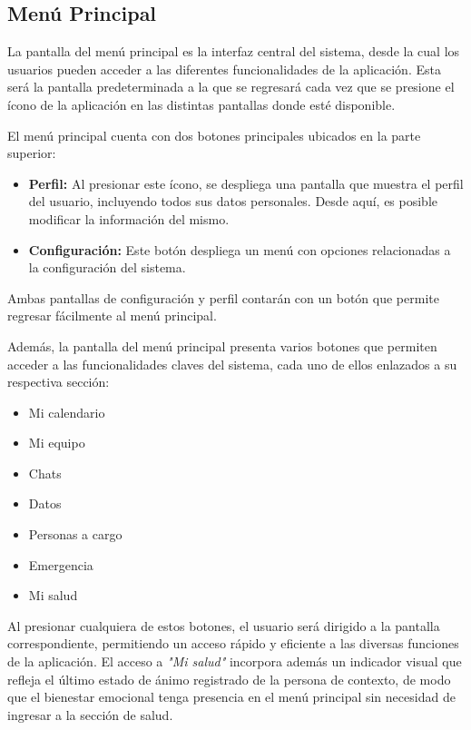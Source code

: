 \documentclass[a4paper,12pt]{article}
\begin{document}
    \subsection{Menú Principal}
    \par La pantalla del menú principal es la interfaz central del sistema, desde la cual los usuarios pueden acceder a las diferentes funcionalidades de la aplicación. Esta será la pantalla predeterminada a la que se regresará cada vez que se presione el ícono de la aplicación en las distintas pantallas donde esté disponible.
    \par El menú principal cuenta con dos botones principales ubicados en la parte superior:
    \begin{itemize}
        \item \textbf{Perfil:} Al presionar este ícono, se despliega una pantalla que muestra el perfil del usuario, incluyendo todos sus datos personales. Desde aquí, es posible modificar la información del mismo.
        \item \textbf{Configuración:} Este botón despliega un menú con opciones relacionadas a la configuración del sistema.
    \end{itemize}
    \par Ambas pantallas de configuración y perfil contarán con un botón que permite regresar fácilmente al menú principal.
    \par Además, la pantalla del menú principal presenta varios botones que permiten acceder a las funcionalidades claves del sistema, cada uno de ellos enlazados a su respectiva sección:
    \begin{itemize}
        \item Mi calendario
        \item Mi equipo
        \item Chats
        \item Datos
        \item Personas a cargo
        \item Emergencia
        \item Mi salud
    \end{itemize}
    \par Al presionar cualquiera de estos botones, el usuario será dirigido a la pantalla correspondiente, permitiendo un acceso rápido y eficiente a las diversas funciones de la aplicación. El acceso a \textit{"Mi salud"} incorpora además un indicador visual que refleja el último estado de ánimo registrado de la persona de contexto, de modo que el bienestar emocional tenga presencia en el menú principal sin necesidad de ingresar a la sección de salud.
\end{document}
